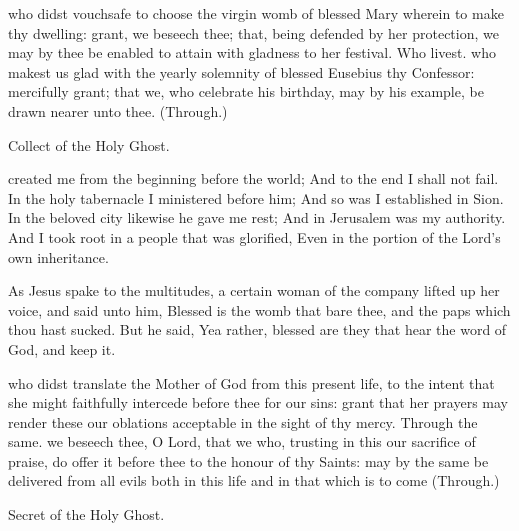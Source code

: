 \collect
{} who didst vouchsafe to choose the virgin womb of blessed Mary wherein to make thy dwelling: grant, we beseech thee; that, being defended by her protection, we may by thee be enabled to attain with gladness to her festival. Who livest.
 who makest us glad with the yearly solemnity of blessed Eusebius thy Confessor: mercifully grant; that we, who celebrate his birthday, may by his example, be drawn nearer unto thee. (Through.)
\begin{rubric}
	 Collect of the Holy Ghost.
\end{rubric}

 created me from the beginning before the world; And to the end I shall not fail. In the holy tabernacle I ministered before him; And so was I established in Sion. In the beloved city likewise he gave me rest; And in Jerusalem was my authority. And I took root in a people that was glorified, Even in the portion of the Lord's own inheritance. 



 As Jesus spake to the multitudes, a certain woman of the company lifted up her voice, and said unto him, Blessed is the womb that bare thee, and the paps which thou hast sucked. But he said, Yea rather, blessed are they that hear the word of God, and keep it.


\secret
{} who didst translate the Mother of God from this present life, to the intent that she might faithfully intercede before thee for our sins: grant that her prayers may render these our oblations acceptable in the sight of thy mercy. Through the same.
 we beseech thee, O Lord, that we who, trusting in this our sacrifice of praise, do offer it before thee to the honour of thy Saints: may by the same be delivered from all evils both in this life and in that which is to come (Through.)
\begin{rubric}
	 Secret of the Holy Ghost.
\end{rubric}

